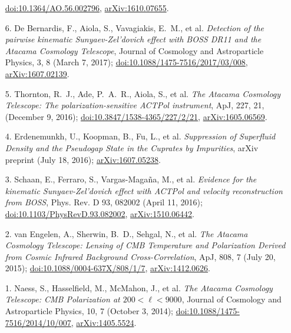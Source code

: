 \documentclass[margin,line]{res}
\begin{document}
\begin{resume}
\begin{enumerate}
    \href{http://dx.doi.org/10.1364/AO.56.002796}{doi:10.1364/AO.56.002796},
    \href{https://arxiv.org/abs/1610.07655}{arXiv:1610.07655}.
\item[{6.}] De Bernardis, F., Aiola, S., Vavagiakis, E.~M., et al.
    \textit{Detection of the pairwise kinematic Sunyaev-Zel'dovich effect with BOSS
    DR11 and the Atacama Cosmology Telescope},
    Journal of Cosmology and Astroparticle Physics, 3, 8 (March 7, 2017);
    \href{http://dx.doi.org/10.1088/1475-7516/2017/03/008}{doi:10.1088/1475-7516/2017/03/008},
    \href{https://arxiv.org/abs/1607.02139}{arXiv:1607.02139}.
\item[{5.}] Thornton, R.~J., Ade, P.~A.~R., Aiola, S., et al. \textit{The
    Atacama Cosmology Telescope: The polarization-sensitive ACTPol instrument}, ApJ, 227, 21,
    (December 9, 2016);
    \href{http://dx.doi.org/10.3847/1538-4365/227/2/21}{doi:10.3847/1538-4365/227/2/21},
    \href{https://arxiv.org/abs/1605.06569}{arXiv:1605.06569}.
\item[{4.}] Erdenemunkh, U., Koopman, B., Fu, L., et al. \textit{Suppression of
    Superfluid Density and the Pseudogap State in the Cuprates by Impurities},
    arXiv preprint (July 18, 2016);
    \href{https://arxiv.org/abs/1607.05238}{arXiv:1607.05238}.
\item[{3.}] Schaan, E., Ferraro, S., Vargas-Maga{\~n}a, M., et al.
    \textit{Evidence for the kinematic Sunyaev-Zel'dovich effect with ACTPol and
    velocity reconstruction from BOSS}, Phys. Rev. D 93, 082002 (April 11, 2016);
    \href{http://journals.aps.org/prd/abstract/10.1103/PhysRevD.93.082002}{doi:10.1103/PhysRevD.93.082002},
    \href{http://arxiv.org/abs/1510.06442}{arXiv:1510.06442}.
\item[{2.}] van Engelen, A., Sherwin, B.~D., Sehgal, N., et al.  \textit{The
    Atacama Cosmology Telescope: Lensing of CMB Temperature and Polarization
    Derived from Cosmic Infrared Background Cross-Correlation}, ApJ, 808, 7 (July
    20, 2015);
    \href{http://dx.doi.org/10.1088/0004-637X/808/1/7}{doi:10.1088/0004-637X/808/1/7},
    \href{http://arxiv.org/abs/1412.0626}{arXiv:1412.0626}.
\item[{1.}] Naess, S., Hasselfield, M., McMahon, J., et al. 
    \textit{The Atacama Cosmology Telescope: CMB Polarization at $200<\ell<9000$},
    Journal of Cosmology and Astroparticle Physics, 10, 7 (October 3, 2014); 
    \href{http://dx.doi.org/10.1088/1475-7516/2014/10/007}{doi:10.1088/1475-7516/2014/10/007}, 
    \href{http://arxiv.org/abs/1405.5524}{arXiv:1405.5524}.
\end{enumerate}


\end{resume}
\end{document}
